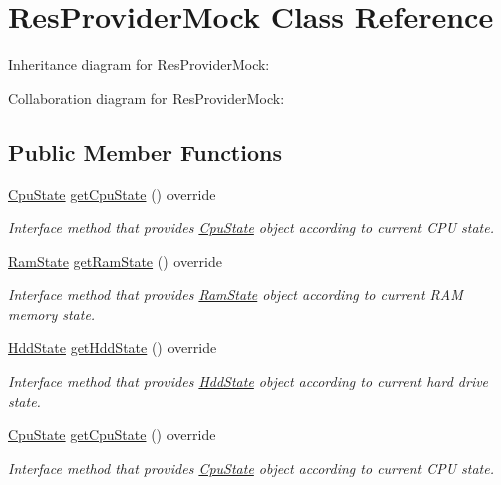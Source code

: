 \hypertarget{classResProviderMock}{}\section{Res\+Provider\+Mock Class Reference}
\label{classResProviderMock}


Inheritance diagram for Res\+Provider\+Mock\+:


Collaboration diagram for Res\+Provider\+Mock\+:
\subsection*{Public Member Functions}
\begin{DoxyCompactItemize}
\item 
\hyperlink{classCpuState}{Cpu\+State} \hyperlink{classResProviderMock_ab41174ae59a127ae6ad40867090b4d6f}{get\+Cpu\+State} () override
\begin{DoxyCompactList}\small\item\em Interface method that provides \hyperlink{classCpuState}{Cpu\+State} object according to current C\+PU state. \end{DoxyCompactList}\item 
\hyperlink{classRamState}{Ram\+State} \hyperlink{classResProviderMock_a0331cddd2937c9e58ad3f67b064251d0}{get\+Ram\+State} () override
\begin{DoxyCompactList}\small\item\em Interface method that provides \hyperlink{classRamState}{Ram\+State} object according to current R\+AM memory state. \end{DoxyCompactList}\item 
\hyperlink{classHddState}{Hdd\+State} \hyperlink{classResProviderMock_a4e964f4f5f0cee703cdd6f82fc399a16}{get\+Hdd\+State} () override
\begin{DoxyCompactList}\small\item\em Interface method that provides \hyperlink{classHddState}{Hdd\+State} object according to current hard drive state. \end{DoxyCompactList}\item 
\hyperlink{classCpuState}{Cpu\+State} \hyperlink{classResProviderMock_ab41174ae59a127ae6ad40867090b4d6f}{get\+Cpu\+State} () override
\begin{DoxyCompactList}\small\item\em Interface method that provides \hyperlink{classCpuState}{Cpu\+State} object according to current C\+PU state. \end{DoxyCompactList}\item 

\end{DoxyCompactItemize}
